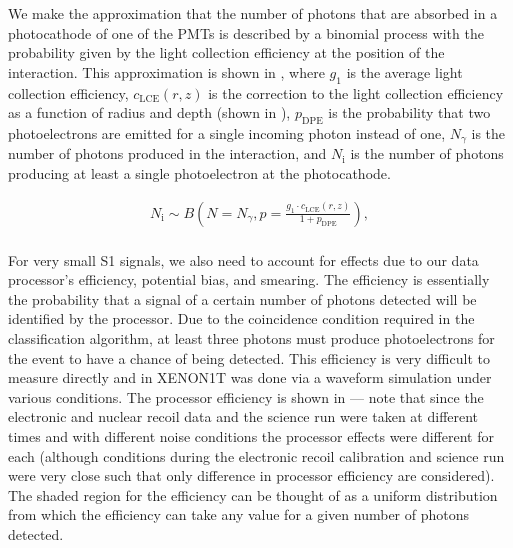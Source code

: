 We make the approximation that the number of photons that are absorbed in a photocathode of one of the PMTs is described by a binomial process with the probability given by the light collection efficiency at the position of the interaction.  This approximation is shown in , where $g_1$ is the average light collection efficiency, $c_{\textrm{LCE}}(r, z)$ is the correction to the light collection efficiency as a function of radius and depth (shown in ), $p_{\textrm{DPE}}$ is the probability that two photoelectrons are emitted for a single incoming photon instead of one, $N_{\gamma}$ is the number of photons produced in the interaction, and $N_{\textrm{i}}$ is the number of photons producing at least a single photoelectron at the photocathode.  


\begin{equation}
        \label{eqn:xe1t_binomial_lce}
        \begin{gathered}
                N_{\textrm{i}} \sim B \left( N = N_{\gamma}, p = \frac{g_1 \cdot c_{\textrm{LCE}}(r, z)}{1 + p_{\textrm{DPE}}} \right), \\
        \end{gathered}
\end{equation}


For very small S1 signals, we also need to account for effects due to our data processor's efficiency, potential bias, and smearing.  The efficiency is essentially the probability that a signal of a certain number of photons detected will be identified by the processor.  Due to the coincidence condition required in the classification algorithm, at least three photons must produce photoelectrons for the event to have a chance of being detected.  This efficiency is very difficult to measure directly and in XENON1T was done via a waveform simulation under various conditions.  The processor efficiency is shown in  --- note that since the electronic and nuclear recoil data and the science run were taken at different times and with different noise conditions the processor effects were different for each (although conditions during the electronic recoil calibration and science run were very close such that only difference in processor efficiency are considered).  The shaded region for the efficiency can be thought of as a uniform distribution from which the efficiency can take any value for a given number of photons detected.


